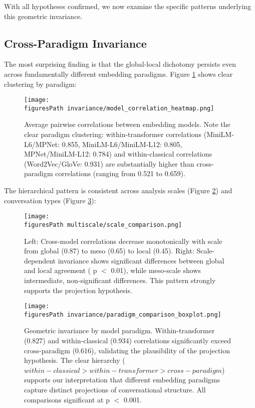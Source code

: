 \documentclass[11pt,letterpaper]{article}
\newcommand{\figuresPath}{../analysis/analysis_output/figures/}
\begin{document}
With all hypotheses confirmed, we now examine the specific patterns underlying this geometric invariance.

\subsection{Cross-Paradigm Invariance}

The most surprising finding is that the global-local dichotomy persists even across fundamentally different embedding paradigms. Figure \ref{fig:pairwise} shows clear clustering by paradigm:

\begin{figure}[H]
\centering
\texttt{[image: \\figuresPath invariance/model\_correlation\_heatmap.png]}
\caption{Average pairwise correlations between embedding models. Note the clear paradigm clustering: within-transformer correlations (MiniLM-L6/MPNet: 0.855, MiniLM-L6/MiniLM-L12: 0.805, MPNet/MiniLM-L12: 0.784) and within-classical correlations (Word2Vec/GloVe: 0.931) are substantially higher than cross-paradigm correlations (ranging from 0.521 to 0.659).}
\label{fig:pairwise}
\end{figure}

The hierarchical pattern is consistent across analysis scales (Figure \ref{fig:dichotomy}) and conversation types (Figure \ref{fig:paradigm}):

\begin{figure}[H]
\centering
\texttt{[image: \\figuresPath multiscale/scale\_comparison.png]}
\caption{Left: Cross-model correlations decrease monotonically with scale from global (0.87) to meso (0.65) to local (0.45). Right: Scale-dependent invariance shows significant differences between global and local agreement ( p $<$ 0.01), while meso-scale shows intermediate, non-significant differences. This pattern strongly supports the projection hypothesis.}
\label{fig:dichotomy}
\end{figure}

\begin{figure}[H]
\centering
\texttt{[image: \\figuresPath invariance/paradigm\_comparison\_boxplot.png]}
\caption{Geometric invariance by model paradigm. Within-transformer (0.827) and within-classical (0.934) correlations significantly exceed cross-paradigm (0.616), validating the plausibility of the projection hypothesis. The clear hierarchy ($within-classical > within-transformer > cross-paradigm$) supports our interpretation that different embedding paradigms capture distinct projections of conversational structure. All comparisons significant at p $<$ 0.001.}
\label{fig:paradigm}
\end{figure}
\end{document}
